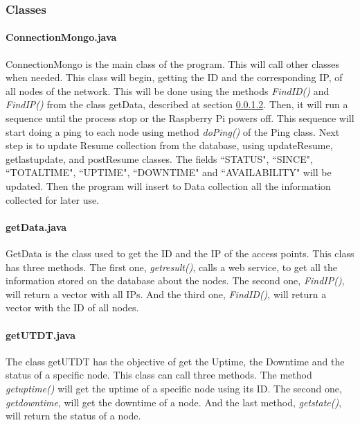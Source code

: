 \documentclass[12pt, a4paper,twoside]{tesi_upf}
\begin{document}
           
        
            \subsubsection{Classes}
            \label{classes}
                \paragraph{ConnectionMongo.java}
                
                ConnectionMongo is the main class of the program. This will call other classes when needed. This class will begin, getting the ID and the corresponding IP, of all nodes of the network. This will be done using the methods \textit{FindID()} and \textit{FindIP()} from the class getData, described at section \ref{getData.java}. Then, it will run a sequence until the process stop or the Raspberry Pi powers off. This sequence will start doing a ping to each node using method \textit{doPing()} of the Ping class. Next step is to update Resume collection from the database, using updateResume, getlastupdate, and postResume classes. The fields ``STATUS", ``SINCE", ``TOTALTIME", ``UPTIME", ``DOWNTIME" and ``AVAILABILITY" will be updated. Then the program will insert to Data collection all the information collected for later use.\\
            
                \paragraph{getData.java}
                \label{getData.java}
                 
                GetData is the class used to get the ID and the IP of the access points. This class has three methods. The first one, \textit{getresult()}, calls a web service, to get all the information stored on the database about the nodes. The second one, \textit{FindIP()}, will return a vector with all IPs. And the third one, \textit{FindID()}, will return a vector with the ID of all nodes.\\

                \paragraph{getUTDT.java}
                
                The class getUTDT has the objective of get the Uptime, the Downtime and the status of a specific node. This class can call three methods. The method \textit{getuptime()} will get the uptime of a specific node using its ID. The second one, \textit{getdowntime}, will get the downtime of a node. And the last method, \textit{getstate()}, will return the status of a node.\\
                
\end{document}
